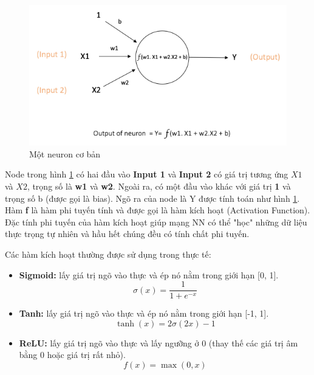 \FloatBarrier
\begin{figure}[htp]
\begin{center}
\includegraphics[scale=1]{chap2/c2_figs/single_neuron.PNG}
\end{center}
\caption{Một neuron cơ bản}
\label{fig:single_neuron}
\end{figure}
\FloatBarrier

Node trong hình \ref{fig:single_neuron} có hai đầu vào \textbf{Input 1} và \textbf{Input 2} có giá trị tương ứng $X1$ và $X2$, trọng số là \textbf{w1} và \textbf{w2}. Ngoài ra, có một đầu vào khác với giá trị \textbf{1} và trọng số b (được gọi là bias). Ngõ ra của node là Y được tính toán như hình \ref{fig:single_neuron}. Hàm \textbf{f} là hàm phi tuyến tính và được gọi là hàm kích hoạt (Activation Function). Đặc tính phi tuyến của hàm kích hoạt giúp mạng NN có thể "học" những dữ liệu thực trọng tự nhiên và hầu hết chúng đều có tính chất phi tuyến.

Các hàm kích hoạt thường được sử dụng trong thực tế:
\begin{itemize}
\item \textbf{Sigmoid:} lấy giá trị ngõ vào thực và ép nó nằm trong giới hạn [0, 1].
\begin{equation}
\sigma (x) = \frac{1}{{1 + {e^{ - x}}}}
\end{equation}
\item \textbf{Tanh:} lấy giá trị ngõ vào thực và ép nó nằm trong giới hạn [-1, 1].
\begin{equation}
\tanh (x) = 2\sigma (2x) - 1
\end{equation}
\item \textbf{ReLU:} lấy giá trị ngõ vào thực và lấy ngưỡng ở 0 (thay thế các giá trị âm bằng 0 hoặc giá trị rất nhỏ).
\begin{equation}
f(x) = \max (0,x)
\end{equation}
\end{itemize}

